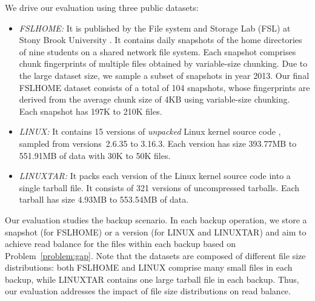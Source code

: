 We drive our evaluation using three public datasets:
\begin{itemize}
\item
{\em FSLHOME:} It is published by the File system and Storage Lab (FSL) at
Stony Brook University \cite{tarasov12}.  It contains daily snapshots of the
home directories of nine students on a shared network file system.  Each
snapshot comprises chunk fingerprints of multiple files obtained by
variable-size chunking.  Due to the large dataset size, we sample a subset of
snapshots in year 2013.  Our final FSLHOME dataset consists of a total of 104
snapshots, whose fingerprints are derived from the average chunk size of 4KB
using variable-size chunking. Each snapshot has 197K to 210K files.
\item
{\em LINUX:}  It contains 15 versions of {\em unpacked} Linux kernel source
code \cite{linux}, sampled from versions~2.6.35 to 3.16.3.  Each version has
size 393.77MB to 551.91MB of data with 30K to 50K files.  
\item
{\em LINUXTAR:}  It packs each version of the Linux kernel source code
\cite{linux} into a single tarball file.  It consists of 321 versions
of uncompressed tarballs.  Each tarball has size 4.93MB to 553.54MB of data.  
\end{itemize}

Our evaluation studies the backup scenario. In each backup operation, we store
a snapshot (for FSLHOME) or a version (for LINUX and LINUXTAR) and aim to
achieve read balance for the files within each backup based on
Problem~\ref{problem:gap}.  Note that the datasets are composed of different
file size distributions: both FSLHOME and LINUX comprise many small
files in each backup, while LINUXTAR contains one large tarball
file in each backup.  Thus, our evaluation addresses the impact of file size
distributions on read balance. 



